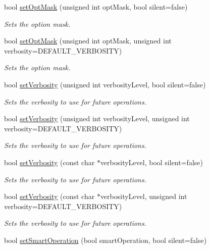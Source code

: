 \begin{DoxyCompactItemize}
bool \mbox{\hyperlink{classOptions_a4352296c6a84486f5d96a2b6afe45040}{set\+Opt\+Mask}} (unsigned int opt\+Mask, bool silent=false)
\begin{DoxyCompactList}\small\item\em Sets the option mask. \end{DoxyCompactList}\item 
bool \mbox{\hyperlink{classOptions_a4f11361434eef369762bbe19c282f29b}{set\+Opt\+Mask}} (unsigned int opt\+Mask, unsigned int verbosity=D\+E\+F\+A\+U\+L\+T\+\_\+\+V\+E\+R\+B\+O\+S\+I\+TY)
\begin{DoxyCompactList}\small\item\em Sets the option mask. \end{DoxyCompactList}\item 
bool \mbox{\hyperlink{classOptions_a46fced99495928a6fc02fa16822dc49c}{set\+Verbosity}} (unsigned int verbosity\+Level, bool silent=false)
\begin{DoxyCompactList}\small\item\em Sets the verbosity to use for future operations. \end{DoxyCompactList}\item 
bool \mbox{\hyperlink{classOptions_a9e04bb50ae096ddd2485edaffb623f86}{set\+Verbosity}} (unsigned int verbosity\+Level, unsigned int verbosity=D\+E\+F\+A\+U\+L\+T\+\_\+\+V\+E\+R\+B\+O\+S\+I\+TY)
\begin{DoxyCompactList}\small\item\em Sets the verbosity to use for future operations. \end{DoxyCompactList}\item 
bool \mbox{\hyperlink{classOptions_aacc3c77821336b90e6c006896faaa669}{set\+Verbosity}} (const char $\ast$verbosity\+Level, bool silent=false)
\begin{DoxyCompactList}\small\item\em Sets the verbosity to use for future operations. \end{DoxyCompactList}\item 
bool \mbox{\hyperlink{classOptions_ae226bc6280efc0579fc059146ee4ef3f}{set\+Verbosity}} (const char $\ast$verbosity\+Level, unsigned int verbosity=D\+E\+F\+A\+U\+L\+T\+\_\+\+V\+E\+R\+B\+O\+S\+I\+TY)
\begin{DoxyCompactList}\small\item\em Sets the verbosity to use for future operations. \end{DoxyCompactList}\item 
bool \mbox{\hyperlink{classOptions_af3dc0f64f6189c5d616c8912f22c7d25}{set\+Smart\+Operation}} (bool smart\+Operation, bool silent=false)

\end{DoxyCompactItemize}
